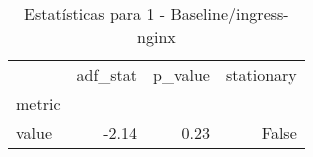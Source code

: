 \begin{table}[htbp]
\caption{Estatísticas para 1 - Baseline/ingress-nginx}
\label{tab:1_-_baseline_ingress-nginx_adf_test}
\begin{tabular}{lrrr}
\toprule
 & adf_stat & p_value & stationary \\
metric &  &  &  \\
\midrule
value & -2.14 & 0.23 & False \\
\bottomrule
\end{tabular}
\end{table}
